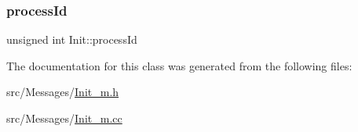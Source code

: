 \subsubsection{\texorpdfstring{process\+Id}{processId}}
{\footnotesize\ttfamily unsigned int Init\+::process\+Id\hspace{0.3cm}{\ttfamily [protected]}}



The documentation for this class was generated from the following files\+:\begin{DoxyCompactItemize}
\item 
src/\+Messages/\hyperlink{Init__m_8h}{Init\+\_\+m.\+h}\item 
src/\+Messages/\hyperlink{Init__m_8cc}{Init\+\_\+m.\+cc}\end{DoxyCompactItemize}

